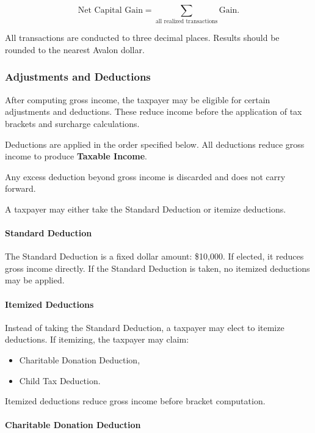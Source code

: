\[
\text{Net Capital Gain} = \sum_{\text{all realized transactions}} \text{Gain}.
\]

All transactions are conducted to three decimal places.
Results should be rounded to the nearest Avalon dollar.

\subsubsection{Adjustments and Deductions}

After computing gross income, the taxpayer may be eligible for certain adjustments and deductions.
These reduce income before the application of tax brackets and surcharge calculations.

Deductions are applied in the order specified below.
All deductions reduce gross income to produce \textbf{Taxable Income}.

Any excess deduction beyond gross income is discarded and does not carry forward.

A taxpayer may either take the Standard Deduction or itemize deductions.

\paragraph{Standard Deduction}

The Standard Deduction is a fixed dollar amount: \$10,000.
If elected, it reduces gross income directly.
If the Standard Deduction is taken, no itemized deductions may be applied.

\medskip

\paragraph{Itemized Deductions}

Instead of taking the Standard Deduction, a taxpayer may elect to itemize deductions.
If itemizing, the taxpayer may claim:

\begin{itemize}
  \item Charitable Donation Deduction,
  \item Child Tax Deduction.
\end{itemize}

Itemized deductions reduce gross income before bracket computation.


\medskip

\paragraph{Charitable Donation Deduction}

